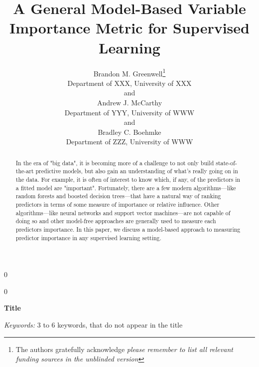 \documentclass[12pt]{article}
\newcommand{\blind}{0}
\begin{document}
%

\def\spacingset#1{\renewcommand{\baselinestretch}%
{#1}\small\normalsize} \spacingset{1}



\blind
{
  \title{\bf A General Model-Based Variable Importance Metric for Supervised Learning}
  \author{Brandon M. Greenwell\thanks{
    The authors gratefully acknowledge \textit{please remember to list all relevant funding sources in the unblinded version}}\hspace{.2cm}\\
    Department of XXX, University of XXX\\
    and \\
    Andrew J. McCarthy \\
    Department of YYY, University of WWW \\
    and \\
    Bradley C. Boehmke \\
    Department of ZZZ, University of WWW }
  \maketitle
} \fi

\blind
{
  \bigskip
  \bigskip
  \bigskip
  \begin{center}
    {\LARGE\bf Title}
\end{center}
  \medskip
} \fi

\bigskip
\begin{abstract}
In the era of "big data", it is becoming more of a challenge to not only build state-of-the-art predictive models, but also gain an understanding of what's really going on in the data. For example, it is often of interest to know which, if any, of the predictors in a fitted model are "important". Fortunately, there are a few modern algorithms---like random forests and boosted decision trees---that have a natural way of ranking predictors in terms of some measure of importance or relative influence. Other algorithms---like neural networks and support vector machines---are not capable of doing so and other model-free approaches are generally used to measure each predictors importance. In this paper, we discuss a model-based approach to measuring predictor importance in any supervised learning setting.
\end{abstract}

\noindent%
{\it Keywords:}  3 to 6 keywords, that do not appear in the title
\vfill
\end{document}
